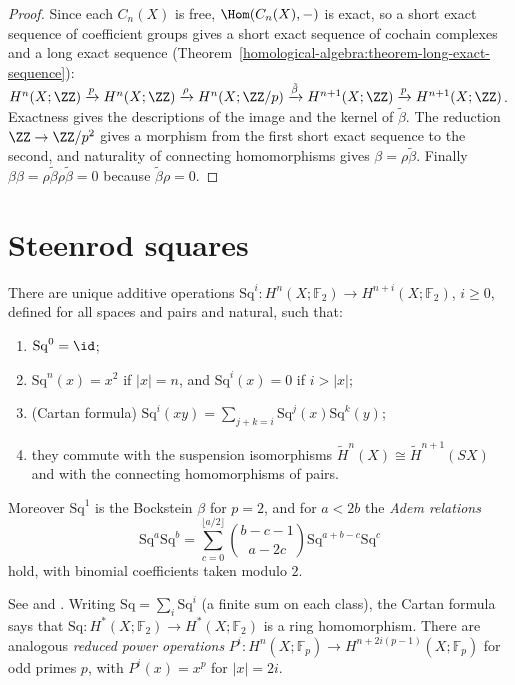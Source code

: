 \begin{proof}
Since each $C_n(X)$ is free, $\Hom(C_n(X), -)$ is exact, so a short exact sequence of coefficient groups gives a short exact sequence of cochain complexes and a long exact
sequence (Theorem~\ref{homological-algebra:theorem-long-exact-sequence}):
$H^n(X; \ZZ) \xrightarrow{p} H^n(X; \ZZ) \xrightarrow{\rho} H^n(X; \ZZ/p) \xrightarrow{\tilde\beta} H^{n+1}(X; \ZZ) \xrightarrow{p} H^{n+1}(X; \ZZ)$. Exactness gives the descriptions of the image
and the kernel of $\tilde\beta$. The reduction $\ZZ \to \ZZ/p^2$ gives a morphism from the first short exact sequence to the second, and naturality of connecting homomorphisms
gives $\beta = \rho\tilde\beta$. Finally $\beta\beta = \rho\tilde\beta\rho\tilde\beta = 0$ because $\tilde\beta\rho = 0$.
\end{proof}

\section{Steenrod squares}\label{cohomology-operations:section-steenrod-squares}

\begin{theorem}[Steenrod]\label{cohomology-operations:theorem-steenrod-squares}
There are unique additive operations $\mathrm{Sq}^i \colon H^n(X; \mathbb{F}_2) \to H^{n+i}(X; \mathbb{F}_2)$, $i \geq 0$, defined for all spaces and pairs and natural, such that:
\begin{enumerate}
\item $\mathrm{Sq}^0 = \id$;
\item $\mathrm{Sq}^n(x) = x^2$ if $|x| = n$, and $\mathrm{Sq}^i(x) = 0$ if $i > |x|$;
\item (Cartan formula) $\mathrm{Sq}^i(xy) = \sum_{j+k=i}\mathrm{Sq}^j(x)\mathrm{Sq}^k(y)$;
\item they commute with the suspension isomorphisms $\tilde{H}^n(X) \cong \tilde{H}^{n+1}(SX)$ and with the connecting homomorphisms of pairs.
\end{enumerate}
Moreover $\mathrm{Sq}^1$ is the Bockstein $\beta$ for $p = 2$, and for $a < 2b$ the \emph{Adem relations}
\[
\mathrm{Sq}^a\mathrm{Sq}^b = \sum_{c=0}^{\lfloor a/2 \rfloor}\binom{b - c - 1}{a - 2c}\mathrm{Sq}^{a+b-c}\mathrm{Sq}^c
\]
hold, with binomial coefficients taken modulo $2$.
\end{theorem}

See \cite{steenrod-epstein} and \cite[Section 4.L]{hatcher-at}. Writing $\mathrm{Sq} = \sum_i \mathrm{Sq}^i$ (a finite sum on each class), the Cartan formula says that
$\mathrm{Sq} \colon H^*(X; \mathbb{F}_2) \to H^*(X; \mathbb{F}_2)$ is a ring homomorphism. There are analogous \emph{reduced power operations}
$P^i \colon H^n(X; \mathbb{F}_p) \to H^{n+2i(p-1)}(X; \mathbb{F}_p)$ for odd primes $p$, with $P^i(x) = x^p$ for $|x| = 2i$.

